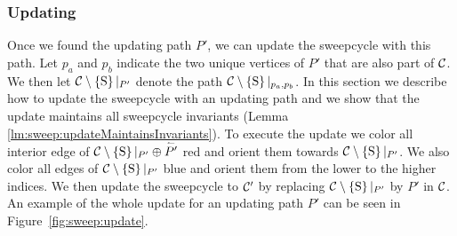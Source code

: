 \subsubsection{Updating}
  \label{sss:sweep:update}
  Once we found the updating path $P'$, we can update the sweepcycle with this path.  Let $p_a$ and $p_b$ indicate the two unique vertices of $P'$ that are also part of $\mathcal{C}$. We then let $\mathcal{C} \setminus \left\lbrace {\mathrm{S}} \right\rbrace|_{P'}$ denote the path $\mathcal{C} \setminus \left\lbrace {\mathrm{S}} \right\rbrace|_{p_a, p_b}$.
  In this section we describe how to update the sweepcycle with an updating path and we show that the update maintains all sweepcycle invariants (Lemma \ref{lm:sweep:updateMaintainsInvariants}).
  To execute the update we color all interior edge of $\mathcal{C} \setminus \left\lbrace {\mathrm{S}} \right\rbrace|_{P'} \oplus \accentset{\leftharpoonup}{P'}$ red and orient them towards $\mathcal{C} \setminus \left\lbrace {\mathrm{S}} \right\rbrace|_{P'}$.
  We also color all edges of $\mathcal{C} \setminus \left\lbrace {\mathrm{S}} \right\rbrace|_{P'}$  blue and orient them from the lower to the higher indices.
  We then update the sweepcycle to $\mathcal{C}'$ by replacing $\mathcal{C} \setminus \left\lbrace {\mathrm{S}} \right\rbrace|_{P'}$ by $P'$ in $\mathcal{C}$.
  An example of the whole update for an updating path $P'$ can be seen in Figure~\ref{fig:sweep:update}.

